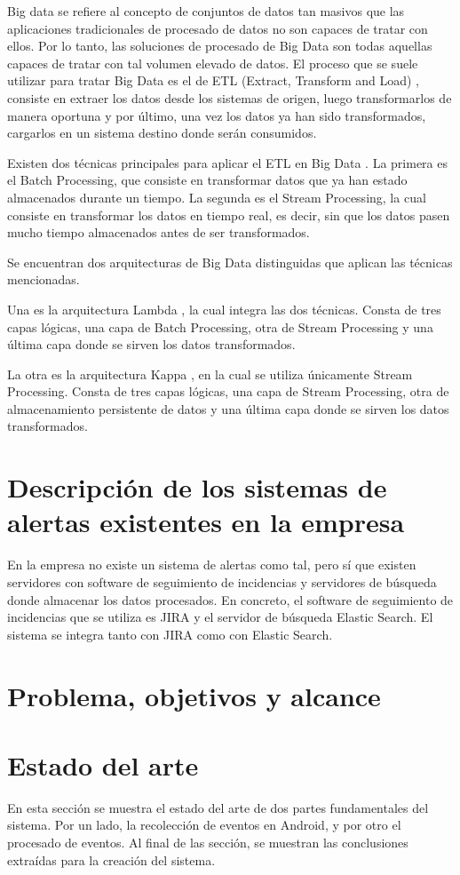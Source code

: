 Big data \cite{Tfg:bigdata} se refiere al concepto de conjuntos de datos tan masivos que las aplicaciones tradicionales de procesado de datos no son capaces de tratar con ellos. Por lo tanto, las soluciones de procesado de Big Data son todas aquellas capaces de tratar con tal volumen elevado de datos. El proceso que se suele utilizar para tratar Big Data es el de ETL (Extract, Transform and Load) \cite{Tfg:etl}, consiste en extraer los datos desde los sistemas de origen, luego transformarlos de manera oportuna y por último, una vez los datos ya han sido transformados, cargarlos en un sistema destino donde serán consumidos. 

Existen dos técnicas principales para aplicar el ETL en Big Data \cite{Tfg:batchstream}. La primera es el Batch Processing, que consiste en transformar datos que ya han estado almacenados durante un tiempo. La segunda es el Stream Processing, la cual consiste en transformar los datos en tiempo real, es decir, sin que los datos pasen mucho tiempo almacenados antes de ser transformados. 

Se encuentran dos arquitecturas de Big Data distinguidas que aplican las técnicas mencionadas. 

Una es la arquitectura Lambda \cite{Tfg:lambda}, la cual integra las dos técnicas. Consta de tres capas lógicas, una capa de Batch Processing, otra de Stream Processing y una última capa donde se sirven los datos transformados.

La otra es la arquitectura Kappa \cite{Tfg:kappa}, en la cual se utiliza únicamente Stream Processing. Consta de tres capas lógicas, una capa de Stream Processing, otra de almacenamiento persistente de datos y una última capa donde se sirven los datos transformados.

\section{Descripción de los sistemas de alertas existentes en la empresa}
En la empresa no existe un sistema de alertas como tal, pero sí que existen servidores con software de seguimiento de incidencias y servidores de búsqueda donde almacenar los datos procesados. En concreto, el software de seguimiento de incidencias que se utiliza es JIRA\cite{Tfg:jira} y el servidor de búsqueda Elastic Search\cite{Tfg:elasticsearch}. El sistema se integra tanto con JIRA como con Elastic Search.

\section{Problema, objetivos y alcance}



\section{Estado del arte}
En esta sección se muestra el estado del arte de dos partes fundamentales del sistema. Por un lado, la recolección de eventos en Android, y por otro el procesado de eventos. Al final de las sección, se muestran las conclusiones extraídas para la creación del sistema.

